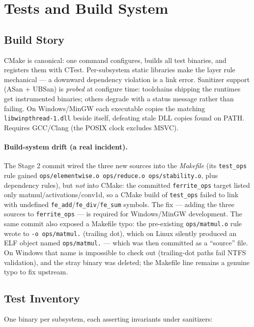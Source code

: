\documentclass[11pt,a4paper]{article}
\begin{document}
\section{Tests and Build System}

\subsection{Build Story}

CMake is canonical: one command configures, builds all test binaries, and
registers them with CTest. Per-subsystem static libraries make the layer rule
mechanical --- a downward dependency violation is a link error. Sanitizer
support (ASan + UBSan) is \emph{probed} at configure time: toolchains shipping
the runtimes get instrumented binaries; others degrade with a status message
rather than failing. On Windows/MinGW each executable copies the matching
\texttt{libwinpthread-1.dll} beside itself, defeating stale DLL copies found on
PATH. Requires GCC/Clang (the POSIX clock excludes MSVC).

\paragraph{Build-system drift (a real incident).} The Stage 2 commit wired the
three new sources into the \emph{Makefile} (its \texttt{test\_ops} rule gained
\texttt{ops/elementwise.o ops/reduce.o ops/stability.o}, plus dependency rules),
but \emph{not} into CMake: the committed \texttt{ferrite\_ops} target listed
only matmul/activations/conv1d, so a CMake build of \texttt{test\_ops} failed
to link with undefined \texttt{fe\_add}/\texttt{fe\_div}/\texttt{fe\_sum}
symbols. The fix --- adding the three sources to \texttt{ferrite\_ops} --- is
required for Windows/MinGW development. The same commit also exposed a Makefile
typo: the pre-existing \texttt{ops/matmul.o} rule wrote to
\texttt{-o ops/matmul.} (trailing dot), which on Linux silently produced an
ELF object named \texttt{ops/matmul.} --- which was then committed as a
``source'' file. On Windows that name is impossible to check out
(trailing-dot paths fail NTFS validation), and the stray binary was deleted;
the Makefile line remains a genuine typo to fix upstream.

\subsection{Test Inventory}

One binary per subsystem, each asserting invariants under sanitizers:
\end{document}
